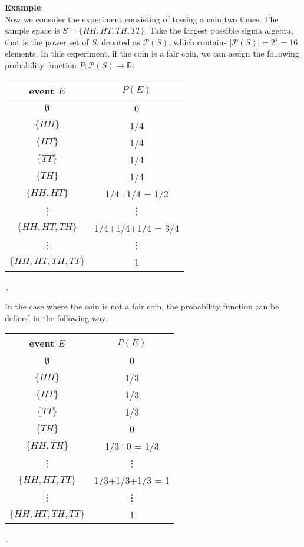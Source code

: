 \documentclass[11pt,oneside]{book}
\theoremstyle{newStyle}
\newcommand{\R}{\mathbb{R}}
\begin{document}
\vspace{2cm}
\textbf{Example}:\\
Now we consider the experiment consisting of tossing a coin two times. The sample space is $S = \{HH, HT, TH, TT\}$. Take the largest possible sigma algebra, that is the power set of $S$, denoted as $\mathcal{P}(S)$, which contains $|\mathcal{P}(S)| = 2^4 = 16$ elements. In this experiment, if the coin is a fair coin, we can assign the following probability function $P: \mathcal{P}(S)\to \R$:
\begin{center}
\begin{tabular}{|c|c|}
\hline \rowcolor{lightgray}
\textbf{event $E$} & $P(E)$\\
\hline
$\emptyset$ & 0 \\
\hline
$\{HH\}$ & 1/4\\
\hline
$\{HT\}$ & 1/4\\
\hline
$\{TT\}$ & 1/4\\
\hline
$\{TH\}$ & 1/4\\
\hline
$\{HH, HT\}$ & 1/4+1/4 = 1/2\\
\hline
\vdots & \vdots \\
\hline
$\{HH, HT, TH\}$ & 1/4+1/4+1/4 = 3/4\\
\hline 
\vdots & \vdots \\
\hline
$\{HH, HT, TH, TT\}$ & 1\\
\hline
\end{tabular}\,.
\end{center}
In the case where the coin is not a fair coin, the probability function can be defined in the following way:
\begin{center}
\begin{tabular}{|c|c|}
\hline \rowcolor{lightgray}
\textbf{event $E$} & $P(E)$\\
\hline
$\emptyset$ & 0 \\
\hline
$\{HH\}$ & 1/3\\
\hline
$\{HT\}$ & 1/3\\
\hline
$\{TT\}$ & 1/3\\
\hline
$\{TH\}$ & 0\\
\hline
$\{HH, TH\}$ & 1/3+0 = 1/3\\
\hline
\vdots & \vdots \\
\hline
$\{HH, HT, TT\}$ & 1/3+1/3+1/3 = 1\\
\hline 
\vdots & \vdots \\
\hline
$\{HH, HT, TH, TT\}$ & 1\\
\hline
\end{tabular}\,.
\end{center}
\end{document}
